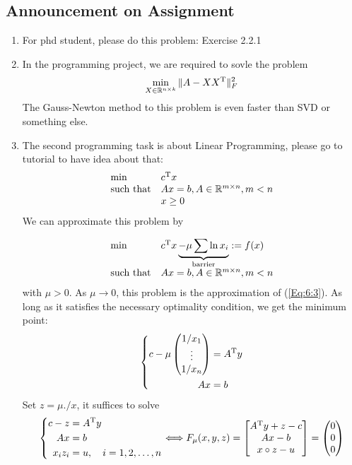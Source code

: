 \subsection{Announcement on Assignment}
\begin{enumerate}
\item
For phd student, please do this problem: Exercise 2.2.1
\item
In the programming project, we are required to sovle the problem
\[
\min_{X\in\mathbb{R}^{n\times k}}\|A - XX^{\mathrm T}\|_F^2
\]
The Gauss-Newton method to this problem is even faster than SVD or something else.
\item
The second programming task is about Linear Programming, please go to tutorial to have idea about that:
\begin{equation}\label{Eq:6:3}
\begin{array}{ll}
\min&c\trans x\\
\mbox{such that}&Ax=b, A\in\mathbb{R}^{m\times n},m<n\\
&x\ge0
\end{array}
\end{equation}
We can approximate this problem by 

\[
\begin{array}{ll}
\min&c^{\mathrm T} x \underbrace{- \mu\sum\ln x_i}_{\text{barrier}}:=f(x)\\
\mbox{such that}&Ax=b, A\in\mathbb{R}^{m\times n},m<n
\end{array}
\]
with $\mu>0$. As $\mu\to0$, this problem is the approximation of (\ref{Eq:6:3}). As long as it satisfies the necessary optimality condition, we get the minimum point:
\[
\left\{
\begin{aligned}
c-\mu\begin{pmatrix}
1/x_1\\\vdots\\1/x_n
\end{pmatrix}&=A^{\mathrm T} y\\
Ax&=b
\end{aligned}\right.
\]
Set $z = \mu./x$, it suffices to solve
\[
\left\{
\begin{aligned}
c-z&=A^{\mathrm T} y\\
Ax&=b\\
x_iz_i&=u,\quad i=1,2,\dots,n
\end{aligned}
\right.
\Longleftrightarrow
F_{\mu}(x,y,z)=\begin{bmatrix}
A^{\mathrm T} y+z-c\\
Ax-b\\
x\circ z-u
\end{bmatrix}=\begin{pmatrix}
0\\0\\0
\end{pmatrix}
\]


\end{enumerate}
